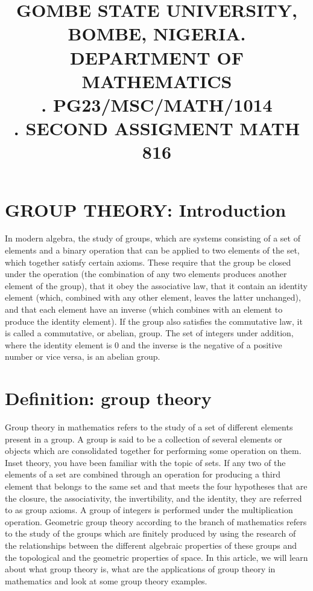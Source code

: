 \documentclass[18pt,a4paper]{article}
\begin{document}
\title{GOMBE STATE UNIVERSITY, BOMBE, NIGERIA. 
\\DEPARTMENT OF MATHEMATICS
\\. PG23/MSC/MATH/1014
\\. SECOND ASSIGMENT MATH 816}
\maketitle
\newpage
\section{GROUP THEORY: Introduction }
In modern algebra, the study of groups, which are systems consisting of a set of elements and a binary operation that can be applied to two elements of the set, which together satisfy certain axioms. These require that the group be closed under the operation (the combination of any two elements produces another element of the group), that it obey the associative law, that it contain an identity element (which, combined with any other element, leaves the latter unchanged), and that each element have an inverse (which combines with an element to produce the identity element). If the group also satisfies the commutative law, it is called a commutative, or abelian, group. The set of integers under addition, where the identity element is 0 and the inverse is the negative of a positive number or vice versa, is an abelian group.


\section{Definition: group theory}
Group theory in mathematics refers to the study of a set of different elements present in a group. A group is said to be a collection of several elements or objects which are consolidated together for performing some operation on them. Inset theory, you have been familiar with the topic of sets. If any two of the elements of a set are combined through an operation for producing a third element that belongs to the same set and that meets the four hypotheses that are the closure, the associativity, the invertibility, and the identity, they are referred to as group axioms. A group of integers is performed under the multiplication operation. Geometric group theory according to the branch of mathematics refers to the study of the groups which are finitely produced by using the research of the relationships between the different algebraic properties of these groups and the topological and the geometric properties of space. In this article, we will learn about what group theory is, what are the applications of group theory in mathematics and look at some group theory examples.
\end{document}
